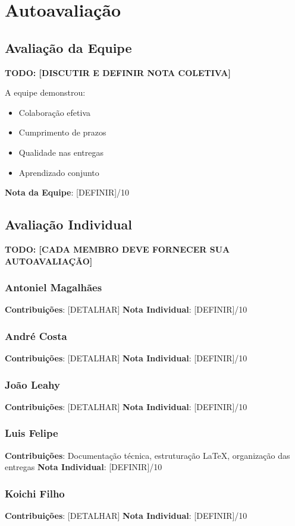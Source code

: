 \documentclass[12pt, a4paper]{report}
\begin{document}
\section{Autoavaliação}

\subsection{Avaliação da Equipe}

\textbf{TODO: [DISCUTIR E DEFINIR NOTA COLETIVA]}

A equipe demonstrou:
\begin{itemize}
    \item Colaboração efetiva
    \item Cumprimento de prazos
    \item Qualidade nas entregas
    \item Aprendizado conjunto
\end{itemize}

\textbf{Nota da Equipe}: [DEFINIR]/10

\subsection{Avaliação Individual}

\textbf{TODO: [CADA MEMBRO DEVE FORNECER SUA AUTOAVALIAÇÃO]}

\subsubsection{Antoniel Magalhães}
\textbf{Contribuições}: [DETALHAR]
\textbf{Nota Individual}: [DEFINIR]/10

\subsubsection{André Costa}
\textbf{Contribuições}: [DETALHAR]
\textbf{Nota Individual}: [DEFINIR]/10

\subsubsection{João Leahy}
\textbf{Contribuições}: [DETALHAR]
\textbf{Nota Individual}: [DEFINIR]/10

\subsubsection{Luis Felipe}
\textbf{Contribuições}: Documentação técnica, estruturação LaTeX, organização das entregas
\textbf{Nota Individual}: [DEFINIR]/10

\subsubsection{Koichi Filho}
\textbf{Contribuições}: [DETALHAR]
\textbf{Nota Individual}: [DEFINIR]/10
\end{document}
